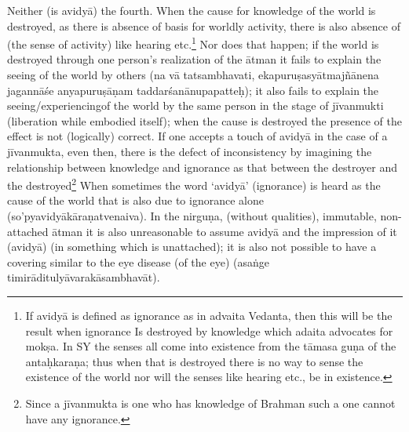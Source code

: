 Neither (is avidyā) the fourth. When the cause for knowledge of the world is destroyed, as there is absence of basis for worldly activity, there is also absence of (the sense of activity) like hearing etc.\footnote{If avidyā is defined as ignorance as in advaita Vedanta, then this will be the result when ignorance Is destroyed by knowledge which adaita advocates for mokṣa. In SY the senses all come into existence from the tāmasa guṇa of the antaḥkaraṇa; thus when that is destroyed there is no way to sense the existence of the world nor will the senses like hearing etc., be in existence.} Nor does that happen; if the world is destroyed through one person’s realization of the ātman it fails to explain the seeing of the world by others (na vā tatsambhavati, ekapuruṣasyātmajñānena jagannāśe anyapuruṣāṇam taddarśanānupapatteḥ); it also fails to explain the seeing/experiencingof the world by the same person in the stage of jīvanmukti (liberation while embodied itself); when the cause is destroyed the presence of the effect is not (logically) correct. If one accepts a touch of avidyā in the case of a jīvanmukta, even then, there is the defect of inconsistency by imagining the relationship between knowledge and ignorance as that between the destroyer and the destroyed\footnote{Since a jīvanmukta is one who has knowledge of Brahman such a one cannot have any ignorance.} When sometimes the word ‘avidyā’ (ignorance) is heard as the cause of the world that is also due to ignorance alone (so’pyavidyākāraṇatvenaiva). In the nirguṇa, (without qualities), immutable, non-attached ātman it is also unreasonable to assume avidyā and the impression of it (avidyā) (in something which is unattached); it is also not possible to have a covering similar to the eye disease (of the eye) (asaṅge timirāditulyāvarakāsambhavāt). 

